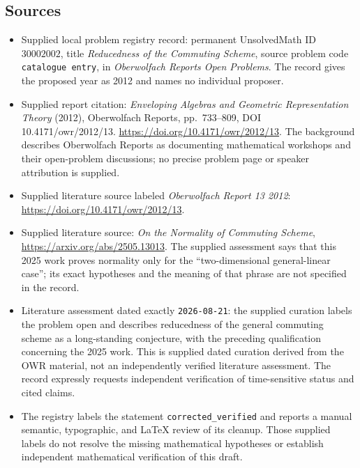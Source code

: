 \documentclass[11pt]{article}
\begin{document}
\subsection{Sources}
\begin{itemize}
\item Supplied local problem registry record: permanent UnsolvedMath ID $30002002$, title \emph{Reducedness of the Commuting Scheme}, source problem code \texttt{catalogue entry}, in \emph{Oberwolfach Reports Open Problems}. The record gives the proposed year as 2012 and names no individual proposer.
\item Supplied report citation: \emph{Enveloping Algebras and Geometric Representation Theory} (2012), Oberwolfach Reports, pp.\ 733--809, DOI 10.4171/owr/2012/13. \url{https://doi.org/10.4171/owr/2012/13}. The background describes Oberwolfach Reports as documenting mathematical workshops and their open-problem discussions; no precise problem page or speaker attribution is supplied.
\item Supplied literature source labeled \emph{Oberwolfach Report 13 2012}: \url{https://doi.org/10.4171/owr/2012/13}.
\item Supplied literature source: \emph{On the Normality of Commuting Scheme}, \url{https://arxiv.org/abs/2505.13013}. The supplied assessment says that this 2025 work proves normality only for the ``two-dimensional general-linear case''; its exact hypotheses and the meaning of that phrase are not specified in the record.
\item Literature assessment dated exactly \texttt{2026-08-21}: the supplied curation labels the problem open and describes reducedness of the general commuting scheme as a long-standing conjecture, with the preceding qualification concerning the 2025 work. This is supplied dated curation derived from the OWR material, not an independently verified literature assessment. The record expressly requests independent verification of time-sensitive status and cited claims.
\item The registry labels the statement \texttt{corrected\_verified} and reports a manual semantic, typographic, and LaTeX review of its cleanup. Those supplied labels do not resolve the missing mathematical hypotheses or establish independent mathematical verification of this draft.
\end{itemize}
\end{document}
